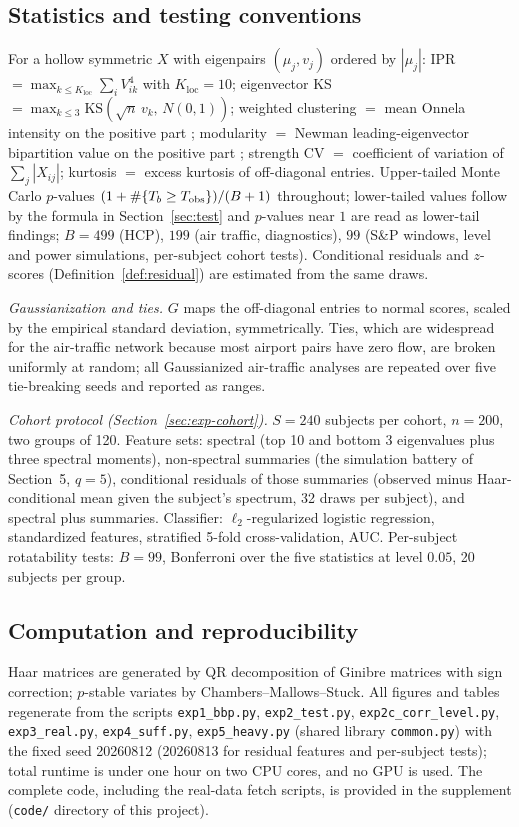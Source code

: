\subsection{Statistics and testing conventions}

For a hollow symmetric $X$ with eigenpairs $(\mu_j,v_j)$ ordered by
$|\mu_j|$: IPR $=\max_{k\le K_{\mathrm{loc}}}\sum_i V_{ik}^4$ with
$K_{\mathrm{loc}}=10$; eigenvector KS
$=\max_{k\le3}\mathrm{KS}(\sqrt n\,v_k,\,N(0,1))$; weighted clustering
$=$ mean Onnela intensity on the positive part
\citep{onnela2005intensity}; modularity $=$ Newman leading-eigenvector
bipartition value on the positive part \citep{newman2006};
strength CV $=$ coefficient of variation of $\sum_j|X_{ij}|$; kurtosis
$=$ excess kurtosis of off-diagonal entries. Upper-tailed Monte Carlo
$p$-values $(1+\#\{T_b\ge T_{\rm obs}\})/(B+1)$ throughout; lower-tailed
values follow by the formula in Section~\ref{sec:test} and $p$-values
near $1$ are read as lower-tail findings; $B=499$ (HCP), $199$ (air
traffic, diagnostics), $99$ (S\&P windows, level and power simulations,
per-subject cohort tests). Conditional residuals and $z$-scores
(Definition~\ref{def:residual}) are estimated from the same draws.

\emph{Gaussianization and ties.} $G$ maps the off-diagonal entries to
normal scores, scaled by the empirical standard deviation, symmetrically.
Ties, which are widespread for the air-traffic network because most
airport pairs have zero flow, are broken uniformly at random; all
Gaussianized air-traffic analyses are repeated over five tie-breaking
seeds and reported as ranges.

\emph{Cohort protocol (Section~\ref{sec:exp-cohort}).} $S=240$ subjects
per cohort, $n=200$, two groups of 120. Feature sets: spectral (top 10
and bottom 3 eigenvalues plus three spectral moments), non-spectral
summaries (the simulation battery of Section~5, $q=5$), conditional residuals of those
summaries (observed minus Haar-conditional mean given the subject's
spectrum, 32 draws per subject), and spectral plus summaries. Classifier:
$\ell_2$-regularized logistic regression, standardized features,
stratified 5-fold cross-validation, AUC. Per-subject rotatability tests:
$B=99$, Bonferroni over the five statistics at level $0.05$, 20 subjects
per group.

\subsection{Computation and reproducibility}

Haar matrices are generated by QR decomposition of Ginibre matrices with
sign correction; $p$-stable variates by Chambers--Mallows--Stuck. All
figures and tables regenerate from the scripts
\texttt{exp1\_bbp.py}, \texttt{exp2\_test.py},
\texttt{exp2c\_corr\_level.py}, \texttt{exp3\_real.py},
\texttt{exp4\_suff.py}, \texttt{exp5\_heavy.py} (shared library
\texttt{common.py}) with the fixed seed 20260812 (20260813 for residual
features and per-subject tests); total runtime is under one hour on two
CPU cores, and no GPU is used. The complete code, including the
real-data fetch scripts, is provided in the supplement
(\texttt{code/} directory of this project).

